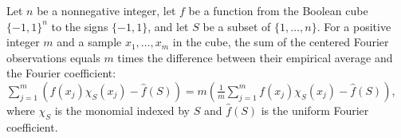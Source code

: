 \begin{theorem}
\label{FABL.sum_centeredFourierObservation_eq_mul_sub_realEmpirical}
\leanok
{}
Let $n$ be a nonnegative integer, let $f$ be a function from the Boolean cube
$\{-1,1\}^n$ to the signs $\{-1,1\}$, and let $S$ be a subset of
$\{1,\ldots,n\}$. For a positive integer $m$ and a sample $x_1,\ldots,x_m$ in the
cube, the sum of the centered Fourier observations equals $m$ times the difference
between their empirical average and the Fourier coefficient: $\sum_{j=1}^m
(f(x_j)\chi_S(x_j)-\widehat f(S))=m(\frac{1}{m}\sum_{j=1}^m
f(x_j)\chi_S(x_j)-\widehat f(S))$, where $\chi_S$ is the monomial indexed by $S$ and
$\widehat f(S)$ is the uniform Fourier coefficient.
\end{theorem}

